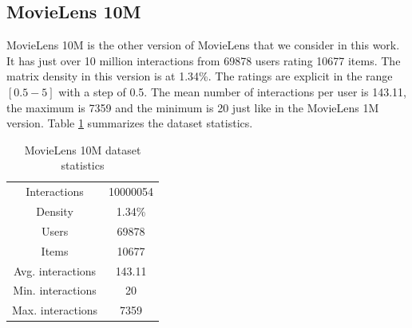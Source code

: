 \subsection{MovieLens 10M}
MovieLens 10M is the other version of MovieLens that we consider in this work. It has just over 10 million interactions from 69878 users rating 10677 items. The matrix density in this version is at 1.34\%. The ratings are explicit in the range $[0.5-5]$ with a step of 0.5. The mean number of interactions per user is 143.11, the maximum is 7359 and the minimum is 20 just like in the MovieLens 1M version. Table \ref{tab:ml10m_stats} summarizes the dataset statistics.

\begin{table}[h!]
    \centering
    \begin{tabular}{c|c}
        \hline
        Interactions & 10000054 \\
        Density & 1.34\% \\
        Users & 69878 \\
        Items & 10677 \\
        Avg. interactions & 143.11 \\
        Min. interactions & 20 \\
        Max. interactions & 7359 \\
        \hline
    \end{tabular}
    \caption{MovieLens 10M dataset statistics}
    \label{tab:ml10m_stats}
\end{table}

